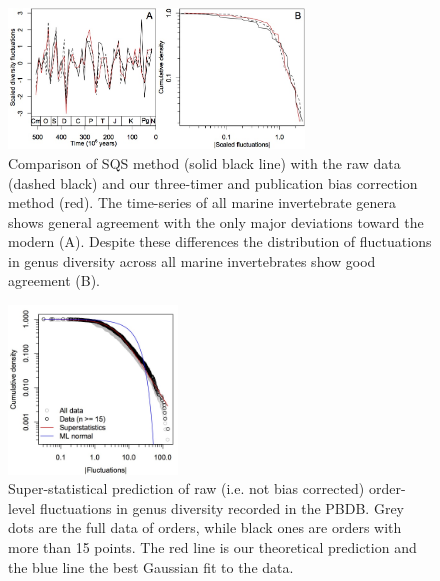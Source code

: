 \documentclass[12pt]{article}
\let\citep=\autocite
\begin{document}
\begin{figure}[!hp]
  \centering
  \includegraphics[width=0.7\textwidth]{figs/figSupp_sqsRaw3tpub.jpg}
  \caption[Comparison of SQS method with the raw data and three-timer
  bias correction method]{Comparison of SQS method \citep{alroy2010}
    (solid black line) with the raw data (dashed black) and our
    three-timer and publication bias correction method (red). The
    time-series of all marine invertebrate genera shows general
    agreement with the only major deviations toward the modern
    (A). Despite these differences the distribution of fluctuations in
    genus diversity across all marine invertebrates show good
    agreement (B).}
  \label{fig:supp_3TPub}
\end{figure}

\begin{figure}[!hp]
  \centering
  \includegraphics[width=0.4\textwidth]{figs/figSupp_pbdbRaw_Px.jpg}
  \caption[Super-statistical prediction of raw data]{Super-statistical
    prediction of raw (i.e. not bias corrected) order-level
    fluctuations in genus diversity recorded in the PBDB. Grey dots
    are the full data of orders, while black ones are orders with more
    than 15 points. The red line is our theoretical prediction and the
    blue line the best Gaussian fit to the data.}
  \label{fig:supp_rawPBDB_Px}
\end{figure}
\end{document}
